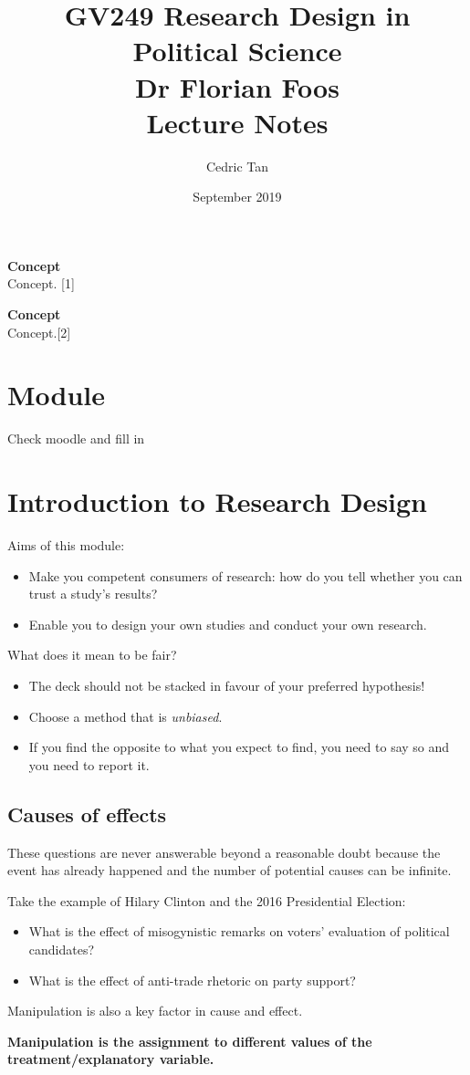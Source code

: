 \documentclass[12pt, letterpaper]{article}
\title{
	{GV249 Research Design in Political Science}\\
	{\large{Dr Florian Foos}}\\
	{\large{Lecture Notes}}
}
\author{Cedric Tan}
\date{September 2019}
\begin{document}
\maketitle
{\small
  \noindent\textbf{Concept}\\
  Concept. \hspace*{\fill}[1]

  \vspace{10pt}
  \noindent\textbf{Concept}\\
  Concept.\hspace*{\fill}[2]

\newpage
\tableofcontents
\newpage

\section{Module}
Check moodle and fill in

\section{Introduction to Research Design}
Aims of this module:
\begin{itemize}
	\item Make you competent consumers of research: how do you tell whether you can trust a study's results? 
	\item Enable you to design your own studies and conduct your own research.
\end{itemize}
What does it mean to be fair?
\begin{itemize}
	\item The deck should not be stacked in favour of your preferred hypothesis!
	\item Choose a method that is \textit{unbiased}.
	\item If you find the opposite to what you expect to find, you need to say so and you need to report it.

\end{itemize}
\subsection{Causes of effects}
These questions are never answerable beyond a reasonable doubt because the event has already happened and the number of potential causes can be infinite.

Take the example of Hilary Clinton and the 2016 Presidential Election:
\begin{itemize}
	\item What is the effect of misogynistic remarks on voters' evaluation of political candidates?
	\item What is the effect of anti-trade rhetoric on party support?
\end{itemize}
Manipulation is also a key factor in cause and effect.
\begin{center}
	\textbf{Manipulation is the assignment to different values of the treatment/explanatory variable.}
\end{center}

}
\end{document}
